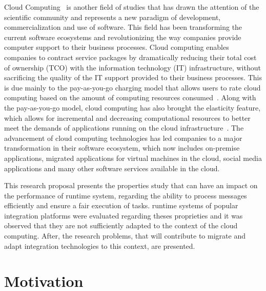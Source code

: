 Cloud Computing~\cite{NIST:2011} is another field of studies that has drawn the attention of the scientific community and represents a new paradigm of development, commercialization and use of software. This field has been transforming the current software ecosystems and revolutionizing the way companies provide computer support to their business processes. Cloud computing enables companies to contract service packages by dramatically reducing their total cost of ownership (TCO) with the information technology (IT) infrastructure, without sacrificing the quality of the IT support provided to their business processes. This is due mainly to the pay-as-you-go charging model that allows users to rate cloud computing based on the amount of computing resources consumed~\cite{buyya:2009,SOUSA:2009}. Along with the pay-as-you-go model, cloud computing has also brought the elasticity feature, which allows for incremental and decreasing computational resources to better meet the demands of applications running on the cloud infrastructure~\cite{DIAS:2015}.
The advancement of cloud computing technologies has led companies to a major transformation in their software ecosystem, which now includes on-premise applications, migrated applications for virtual machines in the cloud, social media applications and many other software services available in the cloud. 

This research proposal presents the properties study that can have an impact on the performance of runtime system, regarding the ability to process messages efficiently and ensure a fair execution of tasks. runtime systems of popular integration platforms were evaluated regarding theses proprieties and it was observed that they are not sufficiently adapted to the context of the cloud computing. After, the research problems, that will contribute to migrate and adapt integration technologies to this context, are presented.
\section{Motivation}

